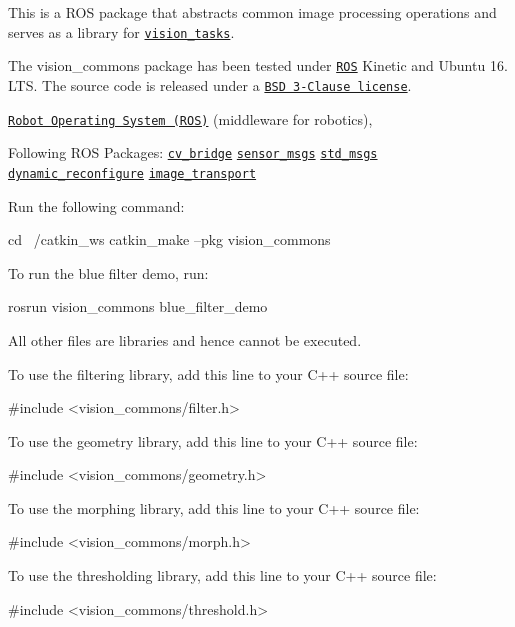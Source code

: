 This is a R\+OS package that abstracts common image processing operations and serves as a library for \href{https://github.com/AUV-IITK/Hyperion-Software/tree/master/vision_layer/vision_tasks}{\tt {\ttfamily vision\+\_\+tasks}}.

The {\ttfamily vision\+\_\+commons} package has been tested under \href{http://www.ros.org}{\tt R\+OS} Kinetic and Ubuntu 16. L\+TS. The source code is released under a \href{../../LICENSE}{\tt B\+SD 3-\/\+Clause license}.


\begin{DoxyItemize}
\item \href{http://wiki.ros.org}{\tt Robot Operating System (R\+OS)} (middleware for robotics),
\item Following R\+OS Packages\+: \href{http://wiki.ros.org/cv_bridge}{\tt cv\+\_\+bridge} \href{http://wiki.ros.org/sensor_msgs}{\tt sensor\+\_\+msgs} \href{http://wiki.ros.org/std_msgs}{\tt std\+\_\+msgs} \href{http://wiki.ros.org/dynamic_reconfigure}{\tt dynamic\+\_\+reconfigure} \href{http://wiki.ros.org/image_transport}{\tt image\+\_\+transport} 
\end{DoxyItemize}

Run the following command\+: 
\begin{DoxyCode}
cd ~/catkin\_ws
catkin\_make --pkg vision\_commons
\end{DoxyCode}


To run the blue filter demo, run\+: 
\begin{DoxyCode}
rosrun vision\_commons blue\_filter\_demo
\end{DoxyCode}
 All other files are libraries and hence cannot be executed.

To use the filtering library, add this line to your C++ source file\+: 
\begin{DoxyCode}
#include <vision\_commons/filter.h>
\end{DoxyCode}
 To use the geometry library, add this line to your C++ source file\+: 
\begin{DoxyCode}
#include <vision\_commons/geometry.h>
\end{DoxyCode}
 To use the morphing library, add this line to your C++ source file\+: 
\begin{DoxyCode}
#include <vision\_commons/morph.h>
\end{DoxyCode}
 To use the thresholding library, add this line to your C++ source file\+: 
\begin{DoxyCode}
#include <vision\_commons/threshold.h>
\end{DoxyCode}


